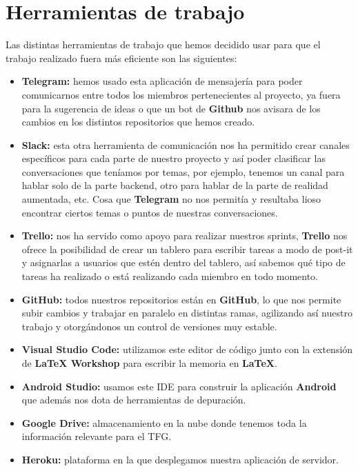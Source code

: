 \section{Herramientas de trabajo}
\label{makereference4.5}
Las distintas herramientas de trabajo que hemos decidido usar para que el trabajo realizado fuera más eficiente son las siguientes:
\begin{itemize}
    \item \textbf{Telegram:} hemos usado esta aplicación de mensajería para poder comunicarnos entre todos los miembros pertenecientes al proyecto, ya fuera para la sugerencia de ideas o que un bot de \textbf{Github} nos avisara de los cambios en los distintos repositorios que hemos creado. 
    \item \textbf{Slack:} esta otra herramienta de comunicación nos ha permitido crear canales específicos para cada parte de nuestro proyecto y así poder clasificar las conversaciones que teníamos por temas, por ejemplo, tenemos un canal para hablar solo de la parte backend, otro para hablar de la parte de realidad aumentada, etc. Cosa que \textbf{Telegram} no nos permitía y resultaba lioso encontrar ciertos temas o puntos de nuestras conversaciones. 
    \item \textbf{Trello:} nos ha servido como apoyo para realizar nuestros sprints, \textbf{Trello} nos ofrece la posibilidad de crear un tablero para escribir tareas a modo de post-it y asignarlas a usuarios que estén dentro del tablero, así sabemos qué tipo de tareas ha realizado o está realizando cada miembro en todo momento.
    \item \textbf{GitHub:} todos nuestros repositorios están en \textbf{GitHub}, lo que nos permite subir cambios y trabajar en paralelo en distintas ramas, agilizando así nuestro trabajo y otorgándonos un control de versiones muy estable.
    \item \textbf{Visual Studio Code:} utilizamos este editor de código junto con la extensión de \textbf{LaTeX Workshop} para escribir la memoria en \textbf{LaTeX}.
    \item \textbf{Android Studio:} usamos este IDE para construir la aplicación \textbf{Android} que además nos dota de herramientas de depuración.
    \item \textbf{Google Drive:} almacenamiento en la nube donde tenemos toda la información relevante para el TFG.
    \item \textbf{Heroku:} plataforma en la que desplegamos nuestra aplicación de servidor.
\end{itemize}
